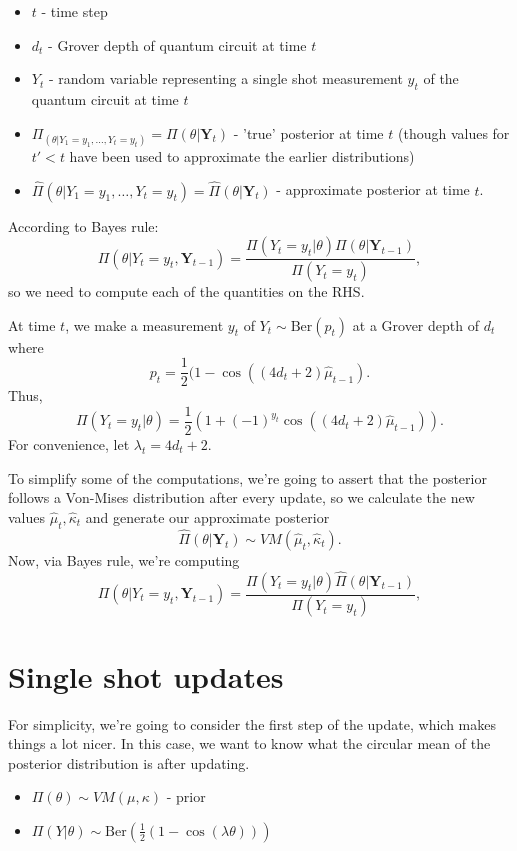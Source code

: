 \documentclass[]{report}
\begin{document}
\begin{itemize}
	\item $t$ - time step
	\item $d_t$ - Grover depth of quantum circuit at time $t$
	\item $Y_t$ - random variable representing a single shot measurement $y_t$ of the quantum circuit at time $t$
	\item $\Pi_(\theta| Y_1 = y_1, \ldots, Y_t = y_t) = \Pi(\theta | \mathbf{Y}_t )$ - 'true' posterior at time $t$ (though values for $t ' < t$ have been used to approximate the earlier distributions)
	\item  $\hat{\Pi}(\theta| Y_1 = y_1, \ldots, Y_t = y_t) = \hat{\Pi}(\theta | \mathbf{Y}_t )$ - approximate posterior at time $t$.
\end{itemize}

According to Bayes rule:
\[
\Pi (\theta | Y_t = y_t, \mathbf{Y}_{t -1}) = \frac{\Pi(Y_t = y_t | \theta) \Pi(\theta | \mathbf{Y}_{t-1})}{\Pi(Y_t = y_t) },
\]
so we need to compute each of the quantities on the RHS.

At time $t$, we make a measurement $y_t$ of $Y_t \sim \text{Ber}(p_t)$ at a Grover depth of $d_t$ where
\[
	p_t = \frac{1}{2}(1 - \cos((4d_t + 2) \hat{\mu}_{t-1}).
\]
Thus,
\[
\Pi(Y_t = y_t | \theta) =  \frac{1}{2}(1 + (-1)^{y_t} \cos((4d_t + 2) \hat{\mu}_{t-1})).
\]
For convenience, let $\lambda_t = 4d_t + 2$.

To simplify some of the computations, we're going to assert that the posterior follows a Von-Mises distribution after every update, so we calculate the new values $\hat{\mu}_t, \hat{\kappa}_t$ and generate our approximate posterior
\[
\hat{\Pi}(\theta | \mathbf{Y}_t )  \sim VM(\hat{\mu}_t, \hat{\kappa}_t).
\]
Now, via Bayes rule, we're computing
\[
\Pi (\theta | Y_t = y_t, \mathbf{Y}_{t -1}) = \frac{\Pi(Y_t = y_t | \theta) \hat{\Pi}(\theta | \mathbf{Y}_{t-1})}{\Pi(Y_t = y_t) },
\]

\section{Single shot updates}
For simplicity, we're going to consider the first step of the update, which makes things a lot nicer. In this case, we want to know what the circular mean of the posterior distribution is after updating.

\begin{itemize}
	\item $\Pi(\theta) \sim VM(\mu, \kappa)$ - prior
	\item $\Pi(Y | \theta) \sim \text{Ber}(\frac{1}{2}(1 - \cos(\lambda \theta)))$
\end{itemize}
\end{document}
